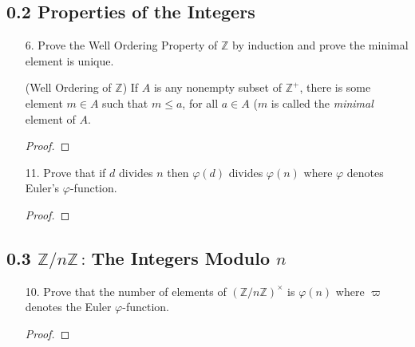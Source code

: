 \documentclass[10pt]{article}
\newcommand{\bb}[1]{\mathbb{#1}} %
\newcommand{\Z}{\bb{Z}} %
\newenvironment{customthm}[1]
  {\renewcommand\thetheorem{#1}\theorem}
  {\endtheorem}
\begin{document}
    \begin{center}
        \section*{0.2 Properties of the Integers}
    \end{center}

    \begin{itemize}
        \item[6.] Prove the Well Ordering Property of \(\Z\) by induction and prove the minimal element is unique.

        \begin{customthm}{}
            (Well Ordering of \(\Z\)) If \(A\) is any nonempty subset of \(\Z^+\), there is some element \(m\in A\) such that \(m\leq a\), for all \(a\in A\) (\(m\) is called the \emph{minimal} element of \(A\).
        \end{customthm}

        \begin{proof}
        \end{proof}
        
    \end{itemize}

    \begin{itemize}
        \item[11.] Prove that if \(d\) divides \(n\) then \(\varphi(d)\) divides \(\varphi(n)\) where \(\varphi\) denotes Euler's \(\varphi\)-function.

        \begin{proof}
        \end{proof}
        
    \end{itemize}

    \begin{center}
        \section*{0.3 \(\Z/n\Z\,:\,\)The Integers Modulo \(n\)}
    \end{center}

    \begin{itemize}
        \item[10.] Prove that the number of elements of \((\Z/n\Z)^\times\) is \(\varphi(n)\) where \(\varpi\) denotes the Euler \(\varphi\)-function.

        \begin{proof}
        \end{proof}
        
    \end{itemize}
\end{document}
